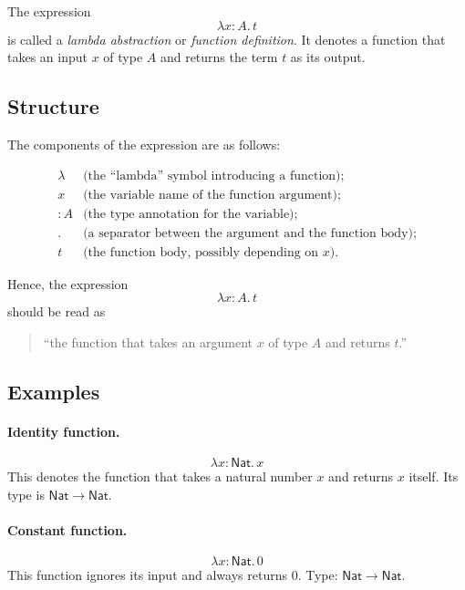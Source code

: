 \documentclass{article}
\newcommand{\Nat}{\mathsf{Nat}}
\begin{document}
The expression
\[
\lambda x\!:\!A.\,t
\]
is called a \emph{lambda abstraction} or \emph{function definition}.  
It denotes a function that takes an input \(x\) of type \(A\) and returns the term \(t\) as its output.

\subsection*{Structure}

The components of the expression are as follows:

\[
\begin{array}{ll}
\lambda & \text{(the ``lambda'' symbol introducing a function);} \\
x & \text{(the variable name of the function argument);} \\
:A & \text{(the type annotation for the variable);} \\
. & \text{(a separator between the argument and the function body);} \\
t & \text{(the function body, possibly depending on \(x\)).}
\end{array}
\]

Hence, the expression
\[
\lambda x\!:\!A.\,t
\]
should be read as
\begin{quote}
``the function that takes an argument \(x\) of type \(A\) and returns \(t\).''  
\end{quote}

\subsection*{Examples}

\paragraph{Identity function.}
\[
\lambda x\!:\!\Nat.\,x
\]
This denotes the function that takes a natural number \(x\) and returns \(x\) itself.  
Its type is \(\Nat \to \Nat\).

\paragraph{Constant function.}
\[
\lambda x\!:\!\Nat.\,0
\]
This function ignores its input and always returns \(0\).  
Type: \(\Nat \to \Nat\).
\end{document}
